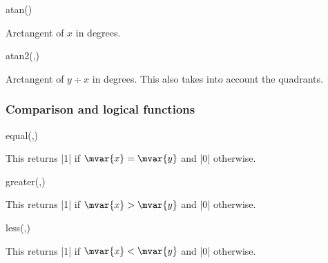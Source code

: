 \begin{math-function}{atan()}
\mathcommand

	Arctangent of $x$ in degrees. 

\begin{codeexample}[]
 \pgfmathresult
\end{codeexample}

\end{math-function}

\begin{math-function}{atan2(,)}

	Arctangent of $y\div x$ in degrees. This also takes into account the
	quadrants.

\begin{codeexample}[]
 \pgfmathresult
\end{codeexample}

\end{math-function}

\subsubsection{Comparison and logical functions}

\label{pgfmath-functions-comparison}

\begin{math-function}{equal(,)}
\mathcommand

	This returns |1| if $\mvar{x}=\mvar{y}$ and |0| otherwise.
	
\begin{codeexample}[]
 \pgfmathresult
\end{codeexample}

\end{math-function}

\begin{math-function}{greater(,)}
\mathcommand

	This returns |1| if $\mvar{x}>\mvar{y}$ and |0| otherwise.
	
\begin{codeexample}[]
 \pgfmathresult
\end{codeexample}

\end{math-function}

\begin{math-function}{less(,)}
\mathcommand

	This returns |1| if $\mvar{x}<\mvar{y}$ and |0| otherwise.
	
\begin{codeexample}[]
 \pgfmathresult
\end{codeexample}
\end{math-function}

